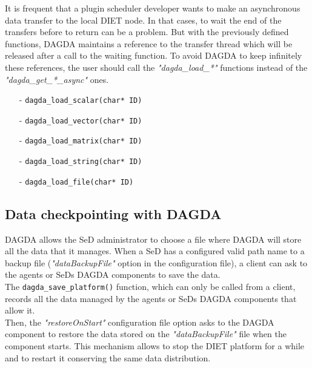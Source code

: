 It is frequent that a plugin scheduler developer wants to make an asynchronous
data transfer to the local DIET node. In that cases, to wait the end of the
transfers before to return can be a problem. But with the previously defined
functions, DAGDA maintains a reference to the transfer thread which will be
released after a call to the waiting function. To avoid DAGDA to keep
infinitely these references, the user should call the \textit{"dagda\_load\_*"}
functions instead of the \textit{"dagda\_get\_*\_async"} ones.

\begin{itemize}
\item[-] \verb#dagda_load_scalar(char* ID)#
\item[-] \verb#dagda_load_vector(char* ID)#
\item[-] \verb#dagda_load_matrix(char* ID)#
\item[-] \verb#dagda_load_string(char* ID)#
\item[-] \verb#dagda_load_file(char* ID)#
\end{itemize}

\subsection{Data checkpointing with DAGDA}
DAGDA allows the SeD administrator to choose a file where DAGDA will store
all the data that it manages. When a SeD has a configured valid path name to a
backup file (\textit{"dataBackupFile"} option in the configuration file),
a client can ask to the agents or SeDs DAGDA components to save the data.\\

The \verb#dagda_save_platform()# function, which can only be
called from a client, records all the data managed by the agents or SeDs DAGDA
components that allow it.\\
Then, the \textit{"restoreOnStart"} configuration file option asks to the
DAGDA component to restore the data stored on the \textit{"dataBackupFile"}
file when the component starts. This mechanism allows to stop the DIET
platform for a while and to restart it conserving the same data distribution.

